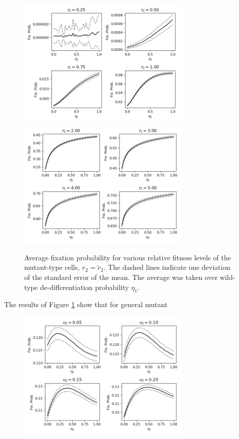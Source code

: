\documentclass[12pt]{article}
\begin{document}
\begin{figure}[!ht]
\begin{center}
\includegraphics[width=0.74\textwidth]{avg_eta1_r2_stackplot1.png}\\
\includegraphics[width=0.74\textwidth]{avg_eta1_r2_stackplot2.png}
\end{center}
\caption{Average fixation probability for various relative fitness levels of the mutant-type cells, $r_2=\tilde{r}_2$. The dashed lines indicate one deviation of the standard error of the mean. The average was taken over wild-type de-differentiation probability $\eta_1$.}\label{r2_stack}
\end{figure}

The results of Figure \ref{r2_stack} show that for general mutant

\begin{figure}[!ht]
\begin{center}
\includegraphics[width=0.74\textwidth]{avg_eta1_u2_stackplot1.png}
\end{center}
\caption{}\label{u2_stack1}
\end{figure}
\end{document}
